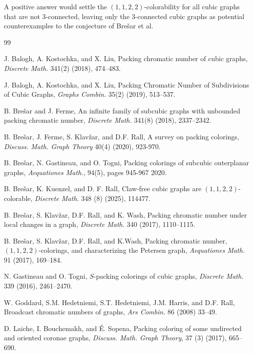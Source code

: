 \documentclass[12pt, oneside]{scrartcl}
\begin{document}
A positive answer would settle the $(1,1,2,2)$-colorability for all cubic graphs that are not $3$-connected, leaving only the $3$-connected cubic graphs as potential counterexamples to the conjecture of Bre\v{s}ar et al.



\begin{thebibliography}{99}

 J. Balogh, A. Kostochka, and X. Liu, Packing chromatic number of cubic graphs, \textit{Discrete Math.} 341(2) (2018), 474--483.

 J. Balogh, A. Kostochka, and X. Liu, Packing Chromatic Number of Subdivisions of Cubic Graphs, \textit{Graphs Combin.} 35(2) (2019), 513--537.

 B. Bre\v{s}ar and J. Ferme, An infinite family of subcubic graphs with unbounded packing chromatic number, \textit{Discrete Math.} 341(8) (2018), 2337--2342.

 B. Brešar, J. Ferme, S. Klavžar, and D.F. Rall, A survey on packing colorings, \textit{Discuss. Math. Graph Theory} 40(4) (2020), 923-970.
 
 B. Bre\v{s}ar, N. Gastineau, and O. Togni, Packing colorings of subcubic outerplanar graphs, \textit{Aequationes Math.}, 94(5), pages 945-967 2020. 

 B. Brešar, K. Kuenzel, and D. F. Rall, Claw-free cubic graphs are $(1, 1, 2, 2)$-colorable, \textit{Discrete Math.} 348 (8) (2025), 114477.
 
 B. Bre\v{s}ar, S. Klav\v{z}ar, D.F. Rall, and K. Wash, Packing chromatic number under local changes in a graph, \textit{Discrete Math.} 340 (2017), 1110--1115.

 B. Bre\v{s}ar, S. Klav\v{z}ar, D.F. Rall, and K.Wash, Packing chromatic number, $(1,1,2,2)$-colorings, and characterizing the Petersen graph, \textit{Aequationes Math.} 91 (2017), 169--184.

 N. Gastineau and O. Togni, $S$-packing colorings of cubic graphs, \textit{Discrete Math.} 339 (2016), 2461--2470.
 
 W. Goddard, S.M. Hedetniemi, S.T. Hedetniemi, J.M. Harris, and D.F. Rall, Broadcast chromatic numbers of graphs, \textit{Ars Combin.} 86 (2008) 33--49. 
 
 D. Laiche, I. Bouchemakh, and \'{E}. Sopena, Packing coloring of some undirected and oriented coronae graphs,\textit{ Discuss. Math. Graph Theory}, 37 (3) (2017), 665--690.
   

\end{thebibliography}
\end{document}

